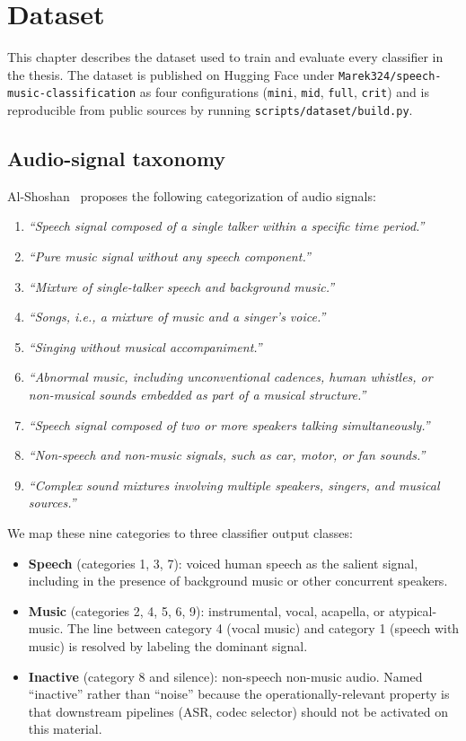 \chapter{Dataset}
\label{cap:dataset}

This chapter describes the dataset used to train and evaluate every classifier in the thesis.
The dataset is published on Hugging Face under \texttt{Marek324/speech-music-classification} as four configurations (\texttt{mini}, \texttt{mid}, \texttt{full}, \texttt{crit}) and is reproducible from public sources by running \texttt{scripts/dataset/build.py}.

\section{Audio-signal taxonomy}
\label{sec:dataset_overview}

Al-Shoshan~\cite{ALSHOSHAN200695} proposes the following categorization of audio signals:
\begin{enumerate}
    \item \textit{``Speech signal composed of a single talker within a specific time period.''}
    \item \textit{``Pure music signal without any speech component.''}
    \item \textit{``Mixture of single-talker speech and background music.''}
    \item \textit{``Songs, i.e., a mixture of music and a singer's voice.''}
    \item \textit{``Singing without musical accompaniment.''}
    \item \textit{``Abnormal music, including unconventional cadences, human whistles, or non-musical sounds embedded as part of a musical structure.''}
    \item \textit{``Speech signal composed of two or more speakers talking simultaneously.''}
    \item \textit{``Non-speech and non-music signals, such as car, motor, or fan sounds.''}
    \item \textit{``Complex sound mixtures involving multiple speakers, singers, and musical sources.''}
\end{enumerate}

We map these nine categories to three classifier output classes:
\begin{itemize}
    \item \textbf{Speech} (categories 1, 3, 7): voiced human speech as the salient signal, including in the presence of background music or other concurrent speakers.
    \item \textbf{Music} (categories 2, 4, 5, 6, 9): instrumental, vocal, acapella, or atypical-music. The line between category 4 (vocal music) and category 1 (speech with music) is resolved by labeling the dominant signal.
    \item \textbf{Inactive} (category 8 and silence): non-speech non-music audio. Named ``inactive'' rather than ``noise'' because the operationally-relevant property is that downstream pipelines (ASR, codec selector) should not be activated on this material.
\end{itemize}


